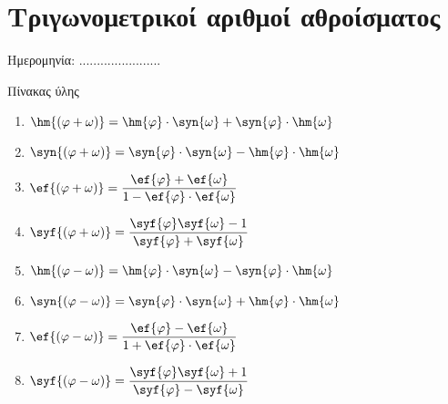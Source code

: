 \documentclass[twoside,nofonts,internet,math,spyros]{frontisthrio}
\newcommand{\myitem}{\stepcounter{enumi}\item[\raisebox{0.5mm}{\faExclamationTriangle}\ \Large$\square$]}
\begin{document}
\section{Τριγωνομετρικοί αριθμοί αθροίσματος}
\begin{flushright}
\faCalendar* Ημερομηνία: .......................
\end{flushright}
\begin{mybox}[mysubtitle]{Πίνακας ύλης}
\begin{multicols}{2}
\begin{todolist}[itemsep=0mm]
\myitem 
\end{todolist}
\end{multicols}
\begin{multicols}{2}
\begin{enumerate}[itemsep=0mm]
\item $ \hm{\left( \varphi+\omega\right) }=\hm{\varphi}\cdot\syn{\omega}+\syn{\varphi}\cdot\hm{\omega} $
\item $ \syn {\left( \varphi+\omega\right) }=\syn{\varphi}\cdot\syn{\omega}-\hm{\varphi}\cdot\hm{\omega} $
\item $ \ef{\left( \varphi+\omega\right) }=\dfrac{\ef{\varphi}+\ef{\omega}}{1-\ef{\varphi}\cdot\ef{\omega}} $
\item $ \syf{\left( \varphi+\omega\right) }=\dfrac{\syf{\varphi}\syf{\omega}-1}{\syf{\varphi}+\syf{\omega}} $
\item $ \hm{\left( \varphi-\omega\right) }=\hm{\varphi}\cdot\syn{\omega}-\syn{\varphi}\cdot\hm{\omega} $
\item $ \syn{\left( \varphi-\omega\right) }=\syn{\varphi}\cdot\syn{\omega}+\hm{\varphi}\cdot\hm{\omega} $
\item $ \ef{\left( \varphi-\omega\right) }=\dfrac{\ef{\varphi}-\ef{\omega}}{1+\ef{\varphi}\cdot\ef{\omega}} $
\item $ \syf{\left( \varphi-\omega\right) }=\dfrac{\syf{\varphi}\syf{\omega}+1}{\syf{\varphi}-\syf{\omega}} $
\end{enumerate}
\end{multicols}
\end{mybox}

\newpage
\end{document}
